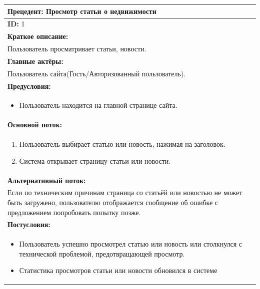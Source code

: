 \documentclass{scrreprt}
\begin{document}
\begin{tabularx}{\textwidth}{|X|}
	\hline
	\textbf{Прецедент: Просмотр статьи о недвижимости} \\
	\hline
	\textbf{ID:} 1 \\
	\hline
	\textbf{Краткое описание:} \\
	Пользователь просматривает статьи, новости. \\
	\hline
	\textbf{Главные актёры:} \\
	Пользователь сайта(Гость/Авторизованный пользователь). \\
	\hline
	\textbf{Предусловия:} \\
	\begin{itemize}[nosep,leftmargin=*]
		\item Пользователь находится на главной странице сайта.
	\end{itemize} \\
	\hline
	\textbf{Основной поток:} \\
	\begin{enumerate}[nosep,leftmargin=*]
		\item Пользователь выбирает статью или новость, нажимая на заголовок.
		\item Система открывает страницу статьи или новости.
	\end{enumerate} \\
	\hline
	\textbf{Альтернативный поток:} \\
	Если по техническим причинам страница со статьёй или новостью не может быть загружено, пользователю отображается сообщение об ошибке с предложением попробовать попытку позже. \\
	\hline
	\textbf{Постусловия:} \\
	\begin{itemize}[nosep,leftmargin=*]
		\item Пользователь успешно просмотрел статью или новость или столкнулся с технической проблемой, предотвращающей просмотр.
		\item Статистика просмотров статьи или новости обновился в системе
	\end{itemize} \\
	\hline
\end{tabularx}
\end{document}
